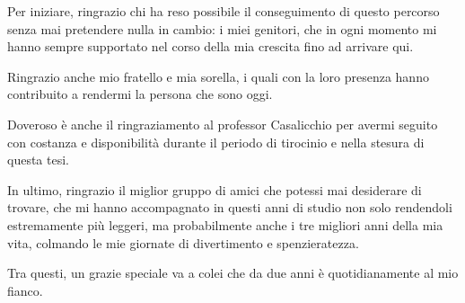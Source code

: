 \documentclass[11pt,a4paper]{report}
\begin{document}
Per iniziare, ringrazio chi ha reso possibile il conseguimento di questo percorso senza mai pretendere nulla in cambio:
i miei genitori, che in ogni momento mi hanno sempre supportato nel corso della mia crescita fino ad arrivare qui.

Ringrazio anche mio fratello e mia sorella, i quali con la loro presenza hanno contribuito a rendermi la persona che sono oggi.

Doveroso è anche il ringraziamento al professor Casalicchio per avermi seguito con costanza e disponibilità
durante il periodo di tirocinio e nella stesura di questa tesi.

In ultimo, ringrazio il miglior gruppo di amici che potessi mai desiderare di trovare, che mi hanno accompagnato in questi anni di studio
non solo rendendoli estremamente più leggeri, ma probabilmente anche i tre migliori anni della mia vita, colmando le mie
giornate di divertimento e spenzieratezza.

Tra questi, un grazie speciale va a colei che da due anni è quotidianamente al mio fianco.
\end{document}
